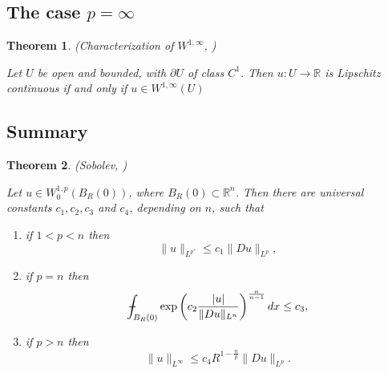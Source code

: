\documentclass[11pt,a4paper]{report}
\newtheorem{theorem}{Theorem}[section]
\theoremstyle{definition}
\def\Xint#1{\mathchoice
{\XXint\displaystyle\textstyle{#1}}%
{\XXint\textstyle\scriptstyle{#1}}%
{\XXint\scriptstyle\scriptscriptstyle{#1}}%
{\XXint\scriptscriptstyle\scriptscriptstyle{#1}}%
\!\int}
\def\XXint#1#2#3{{\setbox0=\hbox{$#1{#2#3}{\int}$}
\vcenter{\hbox{$#2#3$}}\kern-.5\wd0}}
\def\dashint{\Xint-}
\begin{document}
\subsection{The case $p = \infty$}

\begin{theorem}
	\emph{(Characterization of $W^{1, \infty}$, \cite{2010_Evans})}

	Let $U$ be open and bounded, with $\partial U$ of class $C^1$. 
    Then $u: U \rightarrow \mathbb{R}$ is Lipschitz continuous if and only if $u \in W^{1, \infty}(U)$
\end{theorem}

\subsection{Summary}


\begin{theorem}
	\emph{(Sobolev, \cite[Theorem 7.29]{2012_Giaquinta})}

	Let $u \in W_0^{1, p}\left(B_R(0)\right)$, where $B_R(0) \subset \mathbb{R}^n$. Then there are universal constants $c_1, c_2, c_3$ and $c_4$, depending on $n$, such that
	\begin{enumerate}[label=(\alph*)] 
	\rm\item if $1<p<n$ then 
	\begin{equation*} 
		\|u\|_{L^{p^*}} \leq c_1\|D u\|_{L^p},
	\end{equation*}
	\rm\item if $p = n$ then 
	\begin{equation*} 
		\dashint_{B_R(0)} \exp \left(c_2 \frac{|u|}{\|D u\|_{L^n}}\right)^{\frac{n}{n-1}} d x \leq c_3,
	\end{equation*}
	\rm\item if $p>n$ then 
	\begin{equation*} 
		\|u\|_{L^{\infty}} \leq c_4 R^{1-\frac{n}{p}}\|D u\|_{L^p}.
	\end{equation*}
	\end{enumerate}
\end{theorem}





{}
\end{document}
